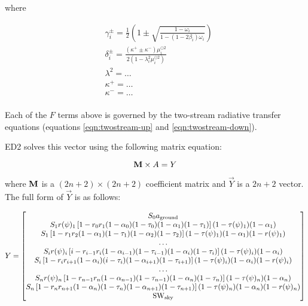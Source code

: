 where

\begin{align}
  & \gamma^{\pm}_{i} = \frac{1}{2} \left( 1 \pm \sqrt{ \frac{1-\omega_{i}}{1-(1-2\beta_{i})\omega_{i}} } \right) \\
  & \delta^{\pm}_{i} = \frac{\left( \kappa^{+} \pm \kappa^{-} \right) \mu^{\odot 2}_{i}}{2\left( 1 - \lambda_{i}^{2} \mu^{\odot 2}_{i}\right)} \\
  & \lambda^{2} = \ldots \\
  & \kappa^{+} = \ldots \\
  & \kappa^{-} = \ldots \\
\end{align}

Each of the $F$ terms above is governed by the two-stream radiative transfer equations (equations \ref{eqn:twostream-up} and \ref{eqn:twostream-down}).




ED2 solves this vector using the following matrix equation:

\begin{equation}
  \mathbf{M} \times \relax{A} = \relax{Y}
\end{equation}

where $\mathbf{M}$ is a $(2n + 2) \times (2n + 2)$ coefficient matrix and $\vec{Y}$ is a $2n + 2$ vector.
The full form of $\vec{Y}$ is as follows:

\begin{equation}
  \relax{Y} =
  \begin{bmatrix}
    S_0 a_{\mathrm{ground}} \\
    S_1 r(\psi)_1 \left[ 1 - r_0 r_1 (1 - \alpha_0) (1 - \tau_0) (1 - \alpha_1) (1 - \tau_1) \right] (1 - \tau(\psi)_1) (1 - \alpha_1) \\
    S_1 \left[ 1 - r_1 r_2 (1 - \alpha_1) (1 - \tau_1) (1 - \alpha_2) (1 - \tau_2) \right] (1 - \tau(\psi)_1) (1 - \alpha_1) (1 - r(\psi)_1) \\
    \ldots \\
    S_i r(\psi)_i \left[ i - r_{i-1} r_i (1 - \alpha_{i-1}) (1 - \tau_{i-1}) (1 - \alpha_i) (1 - \tau_i) \right] (1 - \tau(\psi)_i) (1 - \alpha_i) \\
    S_i \left[ 1 - r_i r_{i+1} (1 - \alpha_i) (i - \tau_i) (1 - \alpha_{i+1}) (1 - \tau_{i+1}) \right] (1 - \tau(\psi)_i) (1 - \alpha_i) (1 - r(\psi)_i) \\
    \ldots \\
    S_n r(\psi)_n \left[ 1 - r_{n-1} r_n (1 - \alpha_{n-1}) (1 - \tau_{n-1}) (1 - \alpha_n) (1 - \tau_n) \right] (1 - \tau(\psi)_n) (1 - \alpha_n) \\
    S_n \left[ 1 - r_n r_{n+1} (1 - \alpha_n) (1 - \tau_n) (1 - \alpha_{n+1}) (1 - \tau_{n+1}) \right] (1 - \tau(\psi)_n) (1 - \alpha_n) (1 - r(\psi)_n) \\
    \mathrm{SW}_{\mathrm{sky}}
  \end{bmatrix}
\end{equation}

